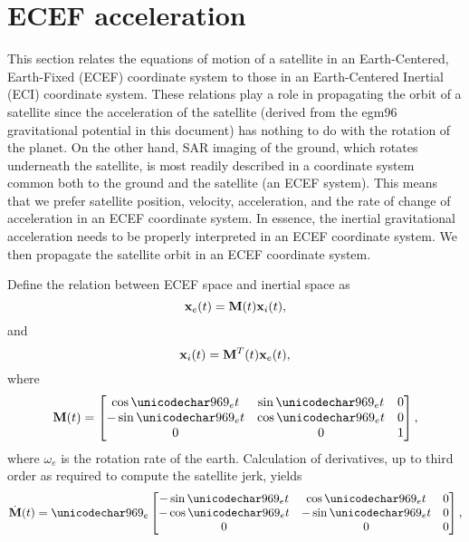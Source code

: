 \section{ECEF acceleration}
\label{an:inertialecef}
This section relates the equations of motion of a satellite in an Earth-Centered, Earth-Fixed (ECEF) coordinate system to those in an Earth-Centered Inertial (ECI) coordinate system. These relations play a role in propagating the orbit of a satellite since the acceleration of the satellite (derived from the egm96 gravitational potential in this document) has nothing to do with the rotation of the planet. On the other hand, SAR imaging of the ground, which rotates underneath the satellite, is most readily described in a coordinate system common both to the ground and the satellite (an ECEF system). This means that we prefer satellite position, velocity, acceleration, and the rate of change of acceleration in an ECEF coordinate system. In essence, the inertial gravitational acceleration needs to be properly interpreted in an ECEF coordinate system. We then propagate the satellite orbit in an ECEF coordinate system.
\par
Define the relation between ECEF space and inertial space as
\begin{equation}
 \vct{x}_e(t)=\mtx{M}(t)\vct{x}_i(t),
\end{equation}
and
\begin{equation}
 \vct{x}_i(t)=\mtx{M}^T(t)\vct{x}_e(t),
\end{equation}
where
\begin{equation}
 \mtx{M}(t)=\begin{bmatrix}
             \ct & \st & 0\\
             -\st & \ct  & 0\\
             0   & 0    & 1
            \end{bmatrix},
\end{equation}
where $\omega_e$ is the rotation rate of the earth.
Calculation of derivatives, up to third order as required to compute the satellite jerk, yields
\begin{equation}
 \dot{\mtx{M}}(t) = \omega_e\begin{bmatrix}
             -\st & \ct & 0\\
             -\ct & -\st  & 0\\
             0   & 0    & 0
            \end{bmatrix},
\end{equation}
